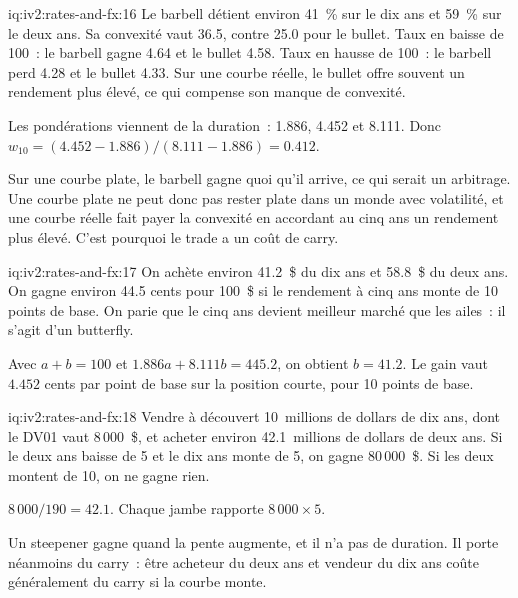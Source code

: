 \begin{solution}{iq:iv2:rates-and-fx:16}
Le barbell détient environ 41~\% sur le dix ans et 59~\% sur le deux ans. Sa convexité vaut 36.5, contre 25.0 pour le bullet. Taux en baisse de 100~: le barbell gagne 4.64 et le bullet 4.58. Taux en hausse de 100~: le barbell perd 4.28 et le bullet 4.33. Sur une courbe réelle, le bullet offre souvent un rendement plus élevé, ce qui compense son manque de convexité.

Les pondérations viennent de la duration~: 1.886, 4.452 et 8.111. Donc $w_{10} = (4.452 - 1.886)/(8.111 - 1.886) = 0.412$.

Sur une courbe plate, le barbell gagne quoi qu'il arrive, ce qui serait un arbitrage. Une courbe plate ne peut donc pas rester plate dans un monde avec volatilité, et une courbe réelle fait payer la convexité en accordant au cinq ans un rendement plus élevé. C'est pourquoi le trade a un coût de carry.

\end{solution}

\begin{solution}{iq:iv2:rates-and-fx:17}
On achète environ 41.2~\$ du dix ans et 58.8~\$ du deux ans. On gagne environ 44.5 cents pour 100~\$ si le rendement à cinq ans monte de 10 points de base. On parie que le cinq ans devient meilleur marché que les ailes~: il s'agit d'un butterfly.

Avec $a + b = 100$ et $1.886a + 8.111b = 445.2$, on obtient $b = 41.2$. Le gain vaut $4.452$ cents par point de base sur la position courte, pour 10 points de base.

\end{solution}

\begin{solution}{iq:iv2:rates-and-fx:18}
Vendre à découvert 10~millions de dollars de dix ans, dont le DV01 vaut 8\,000~\$, et acheter environ 42.1~millions de dollars de deux ans. Si le deux ans baisse de 5 et le dix ans monte de 5, on gagne 80\,000~\$. Si les deux montent de 10, on ne gagne rien.

$8\,000/190 = 42.1$. Chaque jambe rapporte $8\,000 \times 5$.

Un steepener gagne quand la pente augmente, et il n'a pas de duration. Il porte néanmoins du carry~: être acheteur du deux ans et vendeur du dix ans coûte généralement du carry si la courbe monte.

\end{solution}

